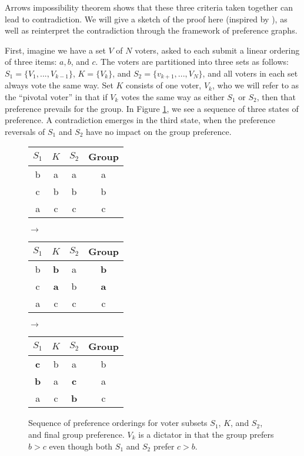 Arrows impossibility theorem shows that these three criteria taken together can lead to contradiction.
We will give a sketch of the proof here (inspired by \cite{geanakoplos:2005}), as well as reinterpret the contradiction through the framework of preference graphs.

\bigskip

First, imagine we have a set $V$ of $N$ voters, asked to each submit a linear ordering of three items: $a, b$, and $c$.
The voters are partitioned into three sets as follows: $S_1 = \{V_1, ..., V_{k-1}\}$, $K = \{V_k\}$, and $S_2 = \{v_{k+1}, ..., V_N\}$, and all voters in each set always vote the same way.
Set $K$ consists of one voter, $V_k$, who we will refer to as the ``pivotal voter'' in that if $V_k$ votes the same way as either $S_1$ or $S_2$, then that preference prevails for the group.
In Figure \ref{fig:impossiblity_tables}, we see a sequence of three states of preference.
A contradiction emerges in the third state, when the preference reversals of $S_1$ and $S_2$ have no impact on the group preference.

\begin{figure}[!htb]
\centering
\begin{tabular}{ c | c | c | c }
 $S_1$ & $K$ & $S_2$ & Group \\ 
 \hline
 b & a & a & a \\ 
 c & b & b & b \\  
 a & c & c & c
\end{tabular}
 $\rightarrow$
\begin{tabular}{ c | c | c | c }
 $S_1$ & $K$ & $S_2$ & Group \\ 
 \hline
 b & \textbf{b} & a & \textbf{b} \\ 
 c & \textbf{a} & b & \textbf{a} \\  
 a & c & c & c
\end{tabular}
 $\rightarrow$
\begin{tabular}{ c | c | c | c }
 $S_1$ & $K$ & $S_2$ & Group \\ 
 \hline
 \textbf{c} & b & a & b \\ 
 \textbf{b} & a & \textbf{c} & a \\  
 a & c & \textbf{b} & c
\end{tabular}
\caption{Sequence of preference orderings for voter subsets $S_1$, $K$, and $S_2$, and final group preference. $V_k$ is a dictator in that the group prefers $b > c$ even though both $S_1$ and $S_2$ prefer $c > b$.}
\label{fig:impossiblity_tables} 
\end{figure}

